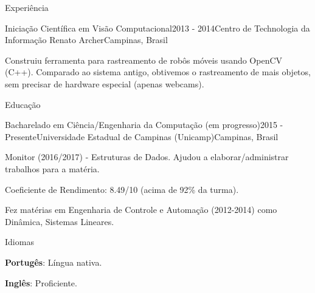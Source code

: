 \documentclass[8pt]{resume}
\newcommand{\tbf}[1]{\textbf{#1}}
\begin{document}
\begin{rSection}{Experiência}
\begin{rSubsection}{Iniciação Científica em Visão Computacional}{2013 - 2014}{Centro de Technologia da Informação Renato Archer}{Campinas, Brasil}
    \item Construiu ferramenta para rastreamento
        de robôs móveis usando OpenCV (C++).
        Comparado ao sistema antigo, obtivemos o rastreamento de mais
        objetos, sem precisar de hardware especial (apenas webcams).
\end{rSubsection}

\end{rSection}

\begin{rSection}{Educação}

    \begin{rSubsection}{Bacharelado em Ciência/Engenharia da Computação (em progresso)}{2015 - Presente}{Universidade Estadual de Campinas (Unicamp)}{Campinas, Brasil}
    \item Monitor (2016/2017) - Estruturas de Dados.
        Ajudou a elaborar/administrar trabalhos para a matéria.
    \item Coeficiente de Rendimento: 8.49/10 (acima de 92\% da turma).
    \item Fez matérias em Engenharia de Controle e Automação (2012-2014)
        como Dinâmica, Sistemas Lineares.
    \end{rSubsection}

\end{rSection}

\begin{rSection}{Idiomas}

    \begin{rSubsection}{}{}{}{}
        \item \tbf{Portugês}: Língua nativa.
        \item \tbf{Inglês}: Proficiente.
    \end{rSubsection}

\end{rSection}
\end{document}
